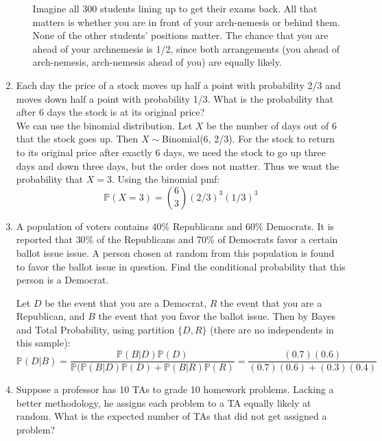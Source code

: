 \documentclass[12pt]{article}
\def\P{{\mathbb P}}
\begin{document}
\begin{enumerate}
\begin{enumerate}
Imagine all 300 students lining up to get their exams back. All that matters is whether you are in front of your arch-nemesis or behind them. None of the other students' positions matter. The chance that you are ahead of your archnemesis is 1/2, since both arrangements (you ahead of arch-nemesis, arch-nemesis ahead of you) are equally likely.
\end{enumerate}

\item Each day the price of a stock moves up half a point with probability 2/3 and moves down half a point with probability 1/3. What is the probability that after 6 days the stock is at its original price?\\

We can use the binomial distribution. Let $X$ be the number of days out of 6 that the stock goes up. Then $X \sim$Binomial(6, 2/3). For the stock to return to its original price after exactly 6 days, we need the stock to go up three days and down three days, but the order does not matter. Thus we want the probability that $X = 3$. Using the binomial pmf:
\[
\P(X = 3) = \binom{6}{3}(2/3)^3(1/3)^3
\]

\item A population of voters contains $40\%$ Republicans and $60\%$ Democrats. It is reported that $30\%$ of the Republicans and $70\%$ of Democrats favor a certain ballot issue issue. A person chosen at random from this population is found to favor the ballot issue in question. Find the conditional probability that this person is a Democrat.

Let $D$ be the event that you are a Democrat, $R$ the event that you are a Republican, and $B$ the event that you favor the ballot issue. Then by Bayes and Total Probability, using partition $\{D, R\}$ (there are no independents in this sample):
\[
\P(D|B) = \frac{ \P(B|D)\P(D)}{\P(\P(B|D)\P(D) + \P(B|R)\P(R)} = \frac{(0.7)(0.6)}{(0.7)(0.6) + (0.3)(0.4)}
\]

\item Suppose a professor has 10 TAs to grade 10 homework problems. Lacking a better methodology, he assigns each problem to a TA equally likely at random. What is the expected number of TAs that did not get assigned a problem?\\


\end{enumerate}
\end{document}
